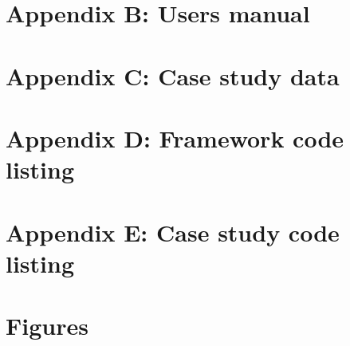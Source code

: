 \documentclass[a4paper, 11pt]{article}
\let\stdsection\section
\renewcommand\section{\newpage\stdsection}
\begin{document}
\section{Appendix B: Users manual}
\section{Appendix C: Case study data}
\section{Appendix D: Framework code listing}
\section{Appendix E: Case study code listing}
\section{Figures}

\end{document}
